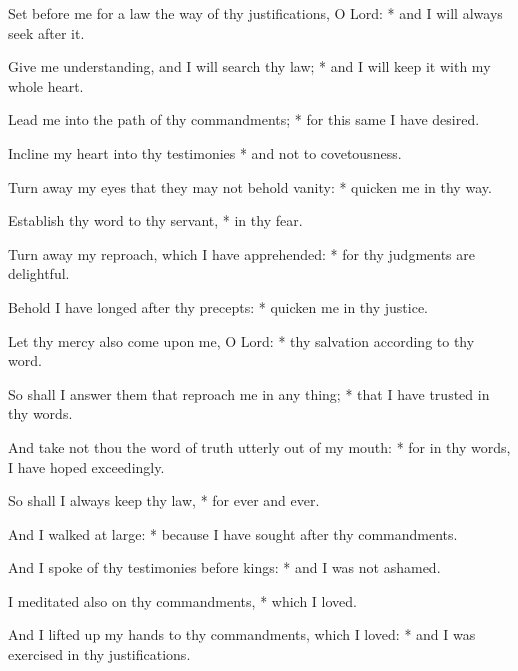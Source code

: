 \item Set before me for a law the way of thy justifications, O Lord: * and I will always seek after it.
\item Give me understanding, and I will search thy law; * and I will keep it with my whole heart.
\item Lead me into the path of thy commandments; * for this same I have desired.
\item Incline my heart into thy testimonies * and not to covetousness.
\item Turn away my eyes that they may not behold vanity: * quicken me in thy way.
\item Establish thy word to thy servant, * in thy fear.
\item Turn away my reproach, which I have apprehended: * for thy judgments are delightful.
\item Behold I have longed after thy precepts: * quicken me in thy justice.
\item Let thy mercy also come upon me, O Lord: * thy salvation according to thy word.
\item So shall I answer them that reproach me in any thing; * that I have trusted in thy words.
\item And take not thou the word of truth utterly out of my mouth: * for in thy words, I have hoped exceedingly.
\item So shall I always keep thy law, * for ever and ever.
\item And I walked at large: * because I have sought after thy commandments.
\item And I spoke of thy testimonies before kings: * and I was not ashamed.
\item I meditated also on thy commandments, * which I loved.
\item And I lifted up my hands to thy commandments, which I loved: * and I was exercised in thy justifications.